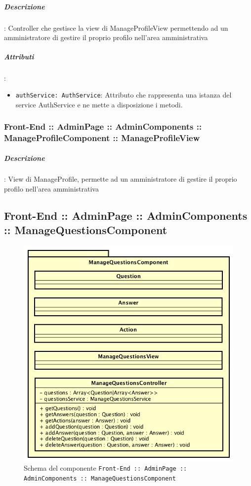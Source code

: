 \documentclass[../ManualeSviluppatore_v1.0.0.tex]{subfiles}
\begin{document}
					\subparagraph{Descrizione}: Controller che gestisce la view di ManageProfileView permettendo ad un amministratore di gestire il proprio profilo nell'area amministrativa
					\subparagraph{Attributi}:
					\begin{itemize}
						\item \texttt{authService: AuthService}: Attributo che rappresenta una istanza del service AuthService e ne mette a disposizione i metodi.
					\end{itemize}
				\subsubsection{Front-End :: AdminPage :: AdminComponents :: ManageProfileComponent :: ManageProfileView}

					\subparagraph{Descrizione}: View di ManageProfile, permette ad un amministratore di gestire il proprio profilo nell'area amministrativa


	\newpage
	\subsection{Front-End :: AdminPage :: AdminComponents :: ManageQuestionsComponent}
	\begin{figure}[!h]
		\centering
		\includegraphics[scale=0.6]{Architettura/Front-End/AdminPage/AdminComponents/ManageQuestionsComponent.png}
		\caption{Schema del componente \texttt{Front-End :: AdminPage :: AdminComponents :: ManageQuestionsComponent}}
	\end{figure}
\end{document}
